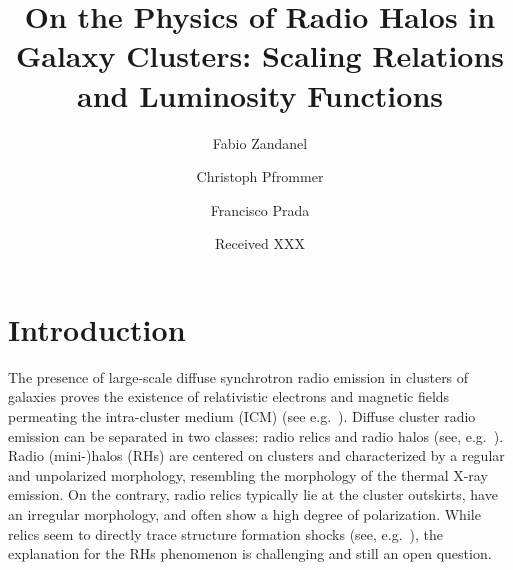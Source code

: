 \documentclass[traditabstract]{aa}
\begin{document}
\title{On the Physics of Radio Halos in Galaxy Clusters: Scaling Relations and Luminosity Functions}

\author{
 Fabio Zandanel \and
 Christoph Pfrommer \and
 Francisco Prada
}

\date{Received XXX}





\maketitle


\section{Introduction}
\label{sec:1}
The presence of large-scale diffuse synchrotron radio emission in clusters of
galaxies proves the existence of relativistic electrons and magnetic fields
permeating the intra-cluster medium (ICM) (see
e.g.~\citealp{2004NewAR..48.1137F}).
\begingroup
\let\thefootnote\relax{}
\endgroup
Diffuse cluster radio emission can be separated in two classes: radio relics and
radio halos (see, e.g.~\citealp{2004rcfg.procE..25K,2008SSRv..134...93F}).
Radio \mbox{(mini-)}halos (RHs) are centered on clusters and characterized by a
regular and unpolarized morphology, resembling the morphology of the thermal
X-ray emission. On the contrary, radio relics typically lie at the cluster
outskirts, have an irregular morphology, and often show a high degree of
polarization. While relics seem to directly trace structure formation shocks
(see, e.g.~\citealp{2011A&A...533A..35V}), the explanation for the RHs phenomenon
is challenging and still an open question.
                                   
\end{document}
